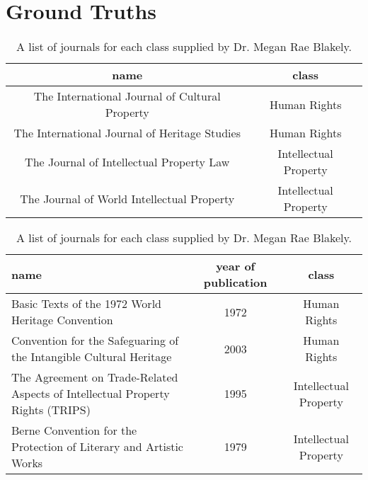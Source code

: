 \appendix
	\chapter{Ground Truths}
		\begin{table}[h]
			\centering
			\begin{tabular}{c|c}
				\hline
				name&class\\
				\hline
				The International Journal of Cultural Property&Human Rights\\
				The International Journal of Heritage Studies&Human Rights\\
				The Journal of Intellectual Property Law&Intellectual Property\\
				The Journal of World Intellectual Property&Intellectual Property
			\end{tabular}
			\caption{A list of journals for each class supplied by Dr. Megan Rae Blakely.}\label{tab:journal-list}
		\end{table}
		\begin{table}[h]
			\centering
			\begin{tabular}{p{8cm}|c|c}
				\hline
				name&year of publication&class\\
				\hline
				Basic Texts of the 1972 World Heritage Convention&1972&Human Rights\\
				Convention for the Safeguaring of the Intangible Cultural Heritage&2003&Human Rights\\
				The Agreement on Trade-Related Aspects of Intellectual Property Rights (TRIPS)&1995&Intellectual Property\\
				Berne Convention for the Protection of Literary and Artistic Works&1979&Intellectual Property
			\end{tabular}
			\caption{A list of journals for each class supplied by Dr. Megan Rae Blakely.}\label{tab:treaty-list}
		\end{table}

